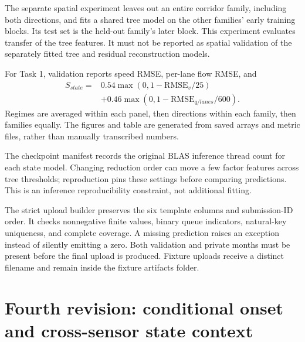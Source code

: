 \documentclass[conference]{IEEEtran}
\begin{document}
The separate spatial experiment leaves out an entire corridor family,
including both directions, and fits a shared tree model on the other families'
early training blocks. Its test set is the held-out family's later block.
This experiment evaluates transfer of the tree features. It must not be
reported as spatial validation of the separately fitted tree and residual reconstruction models.

For Task 1, validation reports speed RMSE, per-lane flow RMSE, and
\begin{equation}
 \begin{split}
 S_{state}={}&0.54\max(0,1-\mathrm{RMSE}_v/25)\\
 &+0.46\max(0,1-\mathrm{RMSE}_{q/lanes}/600).
 \end{split}
\end{equation}
Regimes are averaged within each panel, then directions within each family,
then families equally. The figures and table are generated from saved arrays
and metric files, rather than manually transcribed numbers.

The checkpoint manifest records the original BLAS inference thread count for each state model. Changing reduction order can move a few factor features across tree thresholds; reproduction pins these settings before comparing predictions. This is an inference reproducibility constraint, not additional fitting.

The strict upload builder preserves the six template columns and submission-ID
order. It checks nonnegative finite values, binary queue indicators, natural-key
uniqueness, and complete coverage. A missing prediction raises an exception
instead of silently emitting a zero. Both validation and private months must be
present before the final upload is produced. Fixture uploads receive a distinct
filename and remain inside the fixture artifacts folder.


\section{Fourth revision: conditional onset and cross-sensor state context}
\end{document}
